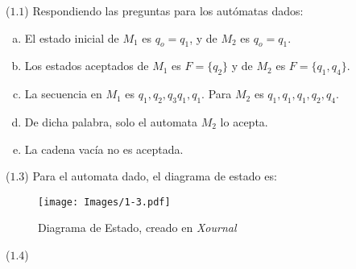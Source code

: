 





\begin{mdframed}[style = warning]
	\begin{problem}
		($1.1$) Respondiendo las preguntas para los autómatas dados:
			\begin{enumerate}[a)]
				\item El estado inicial de $M_1$ es $q_o = q_1$, y de $M_2$ es $q_o = q_1$.
				\item Los estados aceptados de $M_1$ es $F = \{ q_2 \}$ y de $M_2$ es $F = \{ q_1,q_4 \}$.
				\item La secuencia en $M_1$ es $q_1,q_2,q_3q_1,q_1$. Para $M_2$ es $q_1,q_1,q_1,q_2,q_4$.
				\item De dicha palabra, solo el automata $M_2$ lo acepta.
				\item La cadena vacía no es aceptada.
			\end{enumerate}
	\end{problem}
\end{mdframed}











\begin{mdframed}[style = warning]
	\begin{problem}
		($1.3$) Para el automata dado, el diagrama de estado es:
		\begin{figure}[H]
			\centering
			\texttt{[image: Images/1-3.pdf]}
			\caption{Diagrama de Estado, creado en \textit{Xournal}}
			\label{1-3}
		\end{figure}		 
	\end{problem}
\end{mdframed}












\begin{mdframed}[style = warning]
	\begin{problem}
		($1.4$) 	 
	\end{problem}
\end{mdframed}










